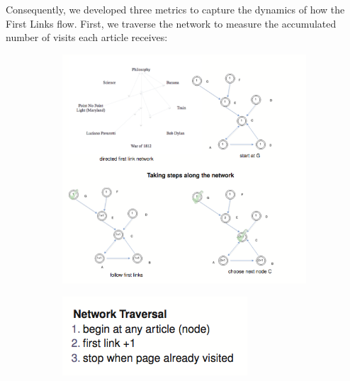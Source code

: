 \documentclass[twoside]{article}
\newcommand{\red}[1]{{\leavevmode\color{sred}{#1}}} %
\begin{document}
Consequently, we developed three metrics to capture the dynamics of how the First Links flow. 
First, we traverse the network to measure the accumulated number of visits each article receives: \\

\begin{figure}[H]
\centering
    \caption{traversing the network}
\begin{subfigure}[b]{0.8\textwidth}
    \includegraphics[width=\textwidth]{graphics/traverse_algo.png}
\end{subfigure}
\end{figure}

\red{[[explain with better diagram]]}

\begin{figure}[H]
\centering
    \caption{traverse procedure}
\begin{subfigure}[b]{0.3\textwidth}
    \includegraphics[width=\textwidth]{graphics/traverse_procedure.png}
\end{subfigure}
\end{figure}
\end{document}
